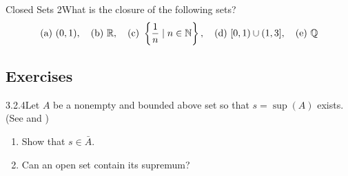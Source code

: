 \begin{example}
    {Closed Sets 2}What is the closure of the following sets? 
    \[
    (\text{a}) \ (0,1), \quad \text{(b)} \ \mathbb{R}, \quad (\text{c}) \ \left\{\frac{1}{n} \mid n \in \mathbb{N}\right\}, \quad (\text{d}) \ [0,1) \cup (1,3], \quad (\text{e}) \ \mathbb{Q}
    \]
\end{example}


\renewcommand{\theenumi}{\alph{enumi}}
\renewcommand{\labelenumi}{(\theenumi)}
\subsection{Exercises}

\begin{exercise}
    {3.2.4}Let \(A\) be a nonempty and bounded above set so that \(s = \sup(A)\) exists. (See  and )
    \begin{enumerate}
        \item Show that \(s \in \bar{A}\).
        \item Can an open set contain its supremum?
    \end{enumerate}
\end{exercise}

